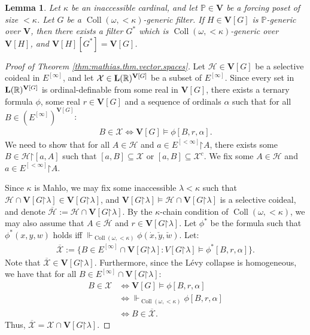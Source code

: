 \documentclass[10pt,a4paper]{amsart}
\theoremstyle{plain}
\numberwithin{equation}{section}
\newtheorem{lemma}[theorem]{Lemma}
\theoremstyle{definition}
\newcommand{\func}{\operatorname}
\newcommand{\R}{\mathbb{R}}
\renewcommand{\P}{\mathbb{P}}
\renewcommand{\bar}[1]{\overline{#1}}
\newcommand{\cal}{\mathcal}
\renewcommand{\bf}{\mathbf}
\newcommand{\forces}{\Vdash}
\newcommand{\restrictedto}{\mathord{\upharpoonright}}
\newcommand{\Coll}{\func{Coll}}
\newcommand{\V}{\bf{V}}
\newcommand{\X}{\cal{X}}
\renewcommand{\H}{\cal{H}}
\let\strokeL\L
\DeclareRobustCommand{\L}{\ifmmode\mathbf{L}\else\strokeL\fi}
\begin{document}
\begin{lemma}
\label{lem:solovay.factor.lemma}
    Let $\kappa$ be an inaccessible cardinal, and let $\P \in \V$ be a forcing poset of size $<\kappa$. Let $G$ be a $\Coll(\omega,<\!\kappa)$-generic filter. If $H \in \V[G]$ is $\P$-generic over $\V$, then there exists a filter $G^*$ which is $\Coll(\omega,<\!\kappa)$-generic over $\V[H]$, and $\V[H][G^*] = \V[G]$.
\end{lemma}

\begin{proof}[Proof of Theorem \ref{thm:mathias.thm.vector.spaces}]
    Let $\H \in \V[G]$ be a selective coideal in $E^{[\infty]}$, and let $\X \in \L(\R)^{\V[G]}$ be a subset of $E^{[\infty]}$. Since every set in $\L(\R)^{\V[G]}$ is ordinal-definable from some real in $\V[G]$, there exists a ternary formula $\phi$, some real $r \in \V[G]$ and a sequence of ordinals $\alpha$ such that for all $B \in (E^{[\infty]})^{\V[G]}$:
    \begin{align*}
        B \in \X \iff \V[G] \models \phi[B,r,\alpha].
    \end{align*}
    We need to show that for all $A \in \H$ and $a \in E^{[<\infty]}\restrictedto A$, there exists some $B \in \H\restrictedto[a,A]$ such that $[a,B] \subseteq \X$ or $[a,B] \subseteq \X^c$. We fix some $A \in \H$ and $a \in E^{[<\infty]}\restrictedto A$.

    Since $\kappa$ is Mahlo, we may fix some inaccessible $\lambda < \kappa$ such that $\H \cap \V[G\restrictedto\lambda] \in \V[G\restrictedto\lambda]$, and $\V[G\restrictedto\lambda] \models \H \cap \V[G\restrictedto\lambda]$ is a selective coideal, and denote $\bar{\H} := \H \cap \V[G\restrictedto\lambda]$. By the $\kappa$-chain condition of $\Coll(\omega,<\!\kappa)$, we may also assume that $A \in \bar{\H}$ and $r \in \V[G\restrictedto\lambda]$. Let $\phi^*$ be the formula such that $\phi^*(x,y,w)$ holds iff $\forces_{\Coll(\omega,<\kappa)} \phi(\dot{x},\check{y},\check{w})$. Let:
    \begin{align*}
        \bar{\X} := \{B \in E^{[\infty]} \cap \V[G\restrictedto\lambda] : V[G\restrictedto\lambda] \models \phi^*[B,r,\alpha]\}.
    \end{align*}
    Note that $\bar{\X} \in \V[G\restrictedto\lambda]$. Furthermore, since the L\'{e}vy collapse is homogeneous, we have that for all $B \in E^{[\infty]} \cap \V[G\restrictedto\lambda]$:
    \begin{align*}
        B \in \X &\iff \V[G] \models \phi[B,r,\alpha] \\
        &\iff \forces_{\Coll(\omega,<\kappa)} \phi[B,r,\alpha] \\
        &\iff B \in \bar{\X}.
    \end{align*}
    Thus, $\bar{\X} = \X \cap \V[G\restrictedto\lambda]$. 


\end{proof}
\end{document}
